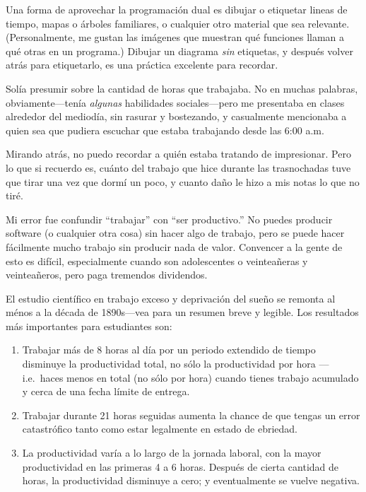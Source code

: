 Una forma de aprovechar la programación dual es dibujar o etiquetar lineas de tiempo,
mapas o árboles familiares,
o cualquier otro material que sea relevante.
(Personalmente, me gustan las imágenes que muestran qué funciones llaman a qué otras en un programa.)
Dibujar un diagrama \emph{sin} etiquetas,
y después volver atrás para etiquetarlo,
es una práctica excelente para recordar.


Solía presumir sobre la cantidad de horas que trabajaba.
No en muchas palabras,
obviamente---tenía \emph{algunas} habilidades sociales---pero
me presentaba en clases alrededor del mediodía,
sin rasurar y bostezando,
y casualmente mencionaba a quien sea que pudiera escuchar
que estaba trabajando desde las 6:00 a.m.

Mirando atrás,
no puedo recordar a quién estaba tratando de impresionar.
Pero lo que si recuerdo es,
cuánto del trabajo que hice durante las trasnochadas tuve que tirar una vez que dormí un poco,
y cuanto daño le hizo a mis notas lo que no tiré.

Mi error fue confundir ``trabajar'' con ``ser productivo.''
No puedes producir software (o cualquier otra cosa) sin hacer algo de trabajo,
pero se puede hacer fácilmente mucho trabajo sin producir nada de valor.
Convencer a la gente de esto es difícil,
especialmente cuando son adolescentes o veinteañeras y veinteañeros,
pero paga tremendos dividendos.

El estudio científico en trabajo exceso y deprivación del sueño se remonta al ménos a la década de 1890s---vea
\cite{Robi2005} para un resumen breve y legible.
Los resultados más importantes para estudiantes son:

\begin{enumerate}

\item
  Trabajar más de 8 horas al día por un periodo extendido de tiempo
  disminuye la productividad total,
  no sólo la productividad por hora ---i.e.\ haces menos en total (no sólo por hora)
  cuando tienes trabajo acumulado y cerca de una fecha límite de entrega.

\item
  Trabajar durante 21 horas seguidas aumenta la chance de que tengas un error catastrófico
  tanto como estar legalmente en estado de ebriedad.

\item
  La productividad varía a lo largo de la jornada laboral,
  con la mayor productividad en las primeras 4 a 6 horas.
  Después de cierta cantidad de horas,
  la productividad disminuye a cero;
  y eventualmente se vuelve negativa.

\end{enumerate}

